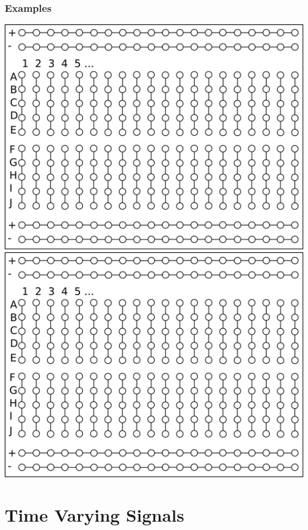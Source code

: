 \documentclass[fleqn]{beamer} %
\newcommand{\sectionIIItitle}{Time Varying Signals}
\newcommand{\sectionIIsubsectionIVtitle}{Examples}
\begin{document}
			\begin{frame}
				\frametitle{\sectionIIsubsectionIVtitle}

				\includegraphics[scale=.050]{images/breadboard_template.png} \hspace{10mm}\includegraphics[scale=.050]{images/breadboard_template.png} 

			\end{frame}
		
	\section{\sectionIIItitle}\label{sectionIII}
\end{document}
